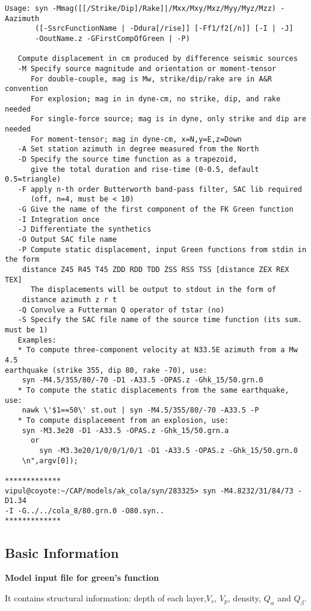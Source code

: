 \documentclass[11pt,titlepage,fleqn]{article}
\begin{document}
\begin{verbatim}
Usage: syn -Mmag([[/Strike/Dip]/Rake]|/Mxx/Mxy/Mxz/Myy/Myz/Mzz) -Aazimuth 
       ([-SsrcFunctionName | -Ddura[/rise]] [-Ff1/f2[/n]] [-I | -J] 
       -OoutName.z -GFirstCompOfGreen | -P)

   Compute displacement in cm produced by difference seismic sources
   -M Specify source magnitude and orientation or moment-tensor
      For double-couple, mag is Mw, strike/dip/rake are in A&R convention
      For explosion; mag in in dyne-cm, no strike, dip, and rake needed
      For single-force source; mag is in dyne, only strike and dip are needed
      For moment-tensor; mag in dyne-cm, x=N,y=E,z=Down
   -A Set station azimuth in degree measured from the North
   -D Specify the source time function as a trapezoid,
      give the total duration and rise-time (0-0.5, default 0.5=triangle)
   -F apply n-th order Butterworth band-pass filter, SAC lib required 
      (off, n=4, must be < 10)
   -G Give the name of the first component of the FK Green function
   -I Integration once
   -J Differentiate the synthetics
   -O Output SAC file name
   -P Compute static displacement, input Green functions from stdin in the form
	distance Z45 R45 T45 ZDD RDD TDD ZSS RSS TSS [distance ZEX REX TEX]
      The displacements will be output to stdout in the form of
	distance azimuth z r t
   -Q Convolve a Futterman Q operator of tstar (no)
   -S Specify the SAC file name of the source time function (its sum. must be 1)
   Examples:
   * To compute three-component velocity at N33.5E azimuth from a Mw 4.5
earthquake (strike 355, dip 80, rake -70), use:
	syn -M4.5/355/80/-70 -D1 -A33.5 -OPAS.z -Ghk_15/50.grn.0
   * To compute the static displacements from the same earthquake, use:
	nawk \'$1==50\' st.out | syn -M4.5/355/80/-70 -A33.5 -P
   * To compute displacement from an explosion, use:
   	syn -M3.3e20 -D1 -A33.5 -OPAS.z -Ghk_15/50.grn.a
      or
        syn -M3.3e20/1/0/0/1/0/1 -D1 -A33.5 -OPAS.z -Ghk_15/50.grn.0
	\n",argv[0]);

*************
vipul@coyote:~/CAP/models/ak_cola/syn/283325> syn -M4.8232/31/84/73 -D1.34 
-I -G../../cola_8/80.grn.0 -O80.syn..
*************
\end{verbatim}

\subsection{Basic Information}
{\bf Model input file for green's function} 

It contains structural information: depth of each layer,$V_s$, $V_p$, density, $Q_\alpha$ and $Q_\beta$.
\end{document}
